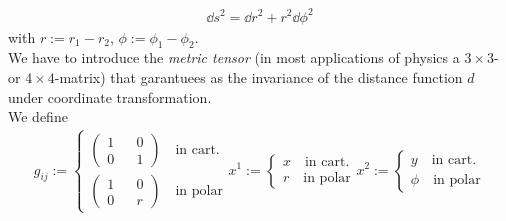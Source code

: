 \begin{align}
    \dd{s}^2 = \dd{r}^2 + r^2 \dd{\phi}^2 
\end{align}
with $r:= r_{1} - r_{2}$, $\phi := \phi_{1} - \phi_{2}$. \\
\noindent We have to introduce the \textit{metric tensor} (in most applications of physics a $3 \times 3$- or $4 \times 4$-matrix) that garantuees as the invariance of the distance function $d$ under coordinate transformation. \\
We define 
\begin{align}
    g_{ij} := \begin{cases} \begin{pmatrix} 1 && 0 \\ 0 && 1 \end{pmatrix} \quad \text{in cart.} \\  \begin{pmatrix} 1 && 0 \\ 0 && r \end{pmatrix} \quad \text{in polar} \end{cases} x^{1} := \begin{cases} x \quad \text{in cart.} \\ r \quad \text{in polar} \end{cases}  x^{2} := \begin{cases} y \quad \text{in cart.} \\ \phi \quad \text{in polar} \end{cases}
\end{align}
